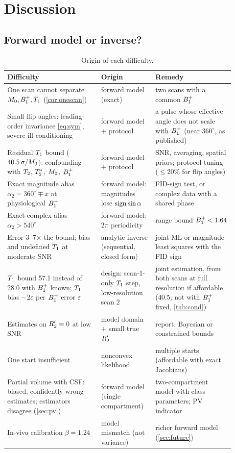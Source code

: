 \section{Discussion}\label{sec:discussion}

\subsection{Forward model or inverse?}

\begin{table}[!htbp]
\centering
\caption{Origin of each difficulty.}
\label{tab:verdict}
\small
\begin{tabular}{p{0.38\linewidth}p{0.22\linewidth}p{0.32\linewidth}}
\toprule
Difficulty & Origin & Remedy\\
\midrule
One scan cannot separate $M_0,B_1^{+},T_1$ (\cref{cor:onescan}) & forward model (exact) & two scans with a common $B_1^{+}$\\
Small flip angles: leading-order invariance \eqref{eq:sym}, severe ill-conditioning & forward model $+$ protocol & a pulse whose effective angle does not scale with $B_1^{+}$ (near $360^\circ$, as published)\\
Residual $T_1$ bound ($40.5\,\sigma/M_0$): confounding with $T_2$, $T_2^{*}$, $M_0$, $B_1^{+}$ & forward model $+$ protocol & SNR, averaging, spatial priors; protocol tuning ($\le20\%$ for flip angles)\\
Exact magnitude alias $\alpha_2=360^\circ\mp x$ at physiological $B_1^{+}$ & forward model: magnitudes lose $\operatorname{sign}\sin\alpha$ & FID-sign test, or complex data with a shared phase\\
Exact complex alias $\alpha_2>540^\circ$ & forward model: $2\pi$ periodicity & range bound $B_1^{+}<1.64$\\
Error 3--7$\times$ the bound; bias and undefined $T_1$ at moderate SNR & analytic inverse (sequential, closed form) & joint ML or magnitude least squares with the FID sign\\
$T_1$ bound 57.1 instead of 28.0 with $B_1^{+}$ known; $T_1$ bias $-2\varepsilon$ per $B_1^{+}$ error $\varepsilon$ & design: scan-1-only $T_1$ step, low-resolution scan 2 & joint estimation, from both scans at full resolution if affordable ($40.5$; not with $B_1^{+}$ fixed, \cref{tab:cond})\\
Estimates on $R_2'=0$ at low SNR & model domain $+$ small true $R_2'$ & report; Bayesian or constrained bounds\\
One start insufficient & nonconvex likelihood & multiple starts (affordable with exact Jacobians)\\
Partial volume with CSF: biased, confidently wrong estimates; estimators disagree (\cref{sec:pv}) & forward model (single compartment) & two-compartment model with class parameters; PV indicator\\
In-vivo calibration $\beta=1.24$ & model mismatch (not variance) & richer forward model (\cref{sec:future})\\
\bottomrule
\end{tabular}
\end{table}

